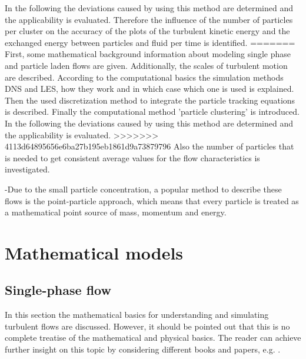 \documentclass[11pt,a4paper,openany,oneside,parskip=half*]{article}
\begin{document}
In the following the deviations caused by using this method are determined and the applicability is evaluated. Therefore the influence of the number of particles per cluster on the accuracy of the plots of the turbulent kinetic energy and the exchanged energy between particles and fluid per time is identified.
=======
First, some mathematical background information about modeling single phase and particle laden flows are given. 
Additionally, the scales of turbulent motion are described.
According to the computational basics the simulation methods DNS and LES, how they work and in which case which one is used is explained.
Then the used discretization method to integrate the particle tracking equations is described.     
Finally the computational method 'particle clustering' is introduced. 
In the following the deviations caused by using this method are determined and the applicability is evaluated.
>>>>>>> 4113d64895656e6ba27b195eb1861d9a73879796
Also the number of particles that is needed to get consistent average values for the flow characteristics is investigated.

-Due to the small particle concentration, a popular method to describe these flows is the point-particle approach, which means that every particle is treated as a mathematical point source of mass, momentum and energy.

\pagebreak
\section{Mathematical models}
\subsection{Single-phase flow} %
In this section the mathematical basics for understanding and simulating turbulent flows are discussed. However, it should be pointed out that this is no
complete treatise of the mathematical and physical basics. The reader can achieve further insight on this topic by considering different books and papers, 
e.g. \cite{turbulentFlows}.
\newline
\end{document}
